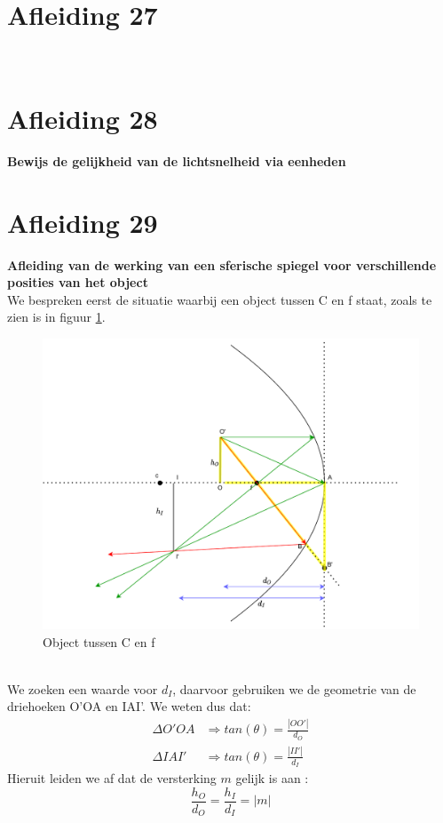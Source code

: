 \documentclass[a4paper,kul]{kulakarticle} %
\begin{document}
\section{Afleiding 27}
\\

\newpage
\section{Afleiding 28}
\textbf{Bewijs de gelijkheid van de lichtsnelheid via eenheden}

\newpage
\section{Afleiding 29}
\textbf{Afleiding van de werking van een sferische spiegel voor verschillende posities van het object}\\
We bespreken eerst de situatie waarbij een object tussen C en f staat, zoals te zien is in figuur \ref{fig:objecttussen}.
\begin{figure}[h]
	\centering
	\includegraphics[width=0.7\linewidth]{ObjectTussen}
	\caption[Object tussen C en f]{Object tussen C en f}
	\label{fig:objecttussen}
\end{figure}\\
We zoeken een waarde voor $d_I$, daarvoor gebruiken we de geometrie van de driehoeken O'OA en IAI'.  We weten dus dat: 
\begin{align*}
	\Delta O'OA&\Rightarrow tan(\theta) = \frac{|OO'|}{d_O}\\
	\Delta IAI'&\Rightarrow tan(\theta) = \frac{|II'|}{d_I}
\end{align*}
Hieruit leiden we af dat de versterking $m$ gelijk is aan :
\begin{equation*}
	\frac{h_O}{d_O} = \frac{h_I}{d_I} = |m|
\end{equation*}
\end{document}
